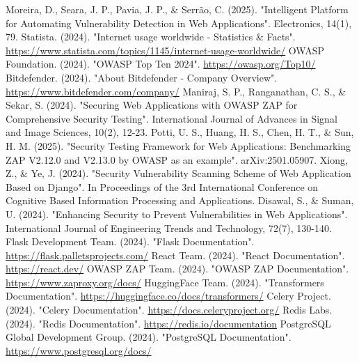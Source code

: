 \documentclass[12pt,A4]{report}
\begin{document}


\singlespace
{}
\begin{thebibliography}{} 
     Moreira, D., Seara, J. P., Pavia, J. P., \& Serrão, C. (2025). "Intelligent Platform for Automating Vulnerability Detection in Web Applications". Electronics, 14(1), 79.
     Statista. (2024). "Internet usage worldwide - Statistics \& Facts". \url{https://www.statista.com/topics/1145/internet-usage-worldwide/}
     OWASP Foundation. (2024). "OWASP Top Ten 2024". \url{https://owasp.org/Top10/}
     Bitdefender. (2024). "About Bitdefender - Company Overview". \url{https://www.bitdefender.com/company/}
     Maniraj, S. P., Ranganathan, C. S., \& Sekar, S. (2024). "Securing Web Applications with OWASP ZAP for Comprehensive Security Testing". International Journal of Advances in Signal and Image Sciences, 10(2), 12-23.
     Potti, U. S., Huang, H. S., Chen, H. T., \& Sun, H. M. (2025). "Security Testing Framework for Web Applications: Benchmarking ZAP V2.12.0 and V2.13.0 by OWASP as an example". arXiv:2501.05907.
     Xiong, Z., \& Ye, J. (2024). "Security Vulnerability Scanning Scheme of Web Application Based on Django". In Proceedings of the 3rd International Conference on Cognitive Based Information Processing and Applications.
     Disawal, S., \& Suman, U. (2024). "Enhancing Security to Prevent Vulnerabilities in Web Applications". International Journal of Engineering Trends and Technology, 72(7), 130-140.
     Flask Development Team. (2024). "Flask Documentation". \url{https://flask.palletsprojects.com/}
     React Team. (2024). "React Documentation". \url{https://react.dev/}
     OWASP ZAP Team. (2024). "OWASP ZAP Documentation". \url{https://www.zaproxy.org/docs/}
     HuggingFace Team. (2024). "Transformers Documentation". \url{https://huggingface.co/docs/transformers/}
     Celery Project. (2024). "Celery Documentation". \url{https://docs.celeryproject.org/}
     Redis Labs. (2024). "Redis Documentation". \url{https://redis.io/documentation}
     PostgreSQL Global Development Group. (2024). "PostgreSQL Documentation". \url{https://www.postgresql.org/docs/}
\end{thebibliography}

\appendix
{}

\end{document}

